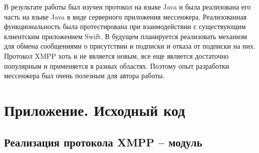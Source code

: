 В результате работы был изучен протокол  на языке Java и была реализована его часть на языке Java в виде серверного приложения мессенжера. Реализованная функциональность была протестирована при взаимодействии с существующим клиентским приложением Swift. В будущем планируется реализовать механизм  для обмена сообщениями о присутствии и подписки и отказа от подписки на них.
Протокол XMPP хоть и не является новым, все еще является достаточно популярным и применяется в разных областях. Поэтому опыт разработки мессенжера был очень полезным для автора работы.

\section{Приложение. Исходный код}

\subsection{Реализация протокола XMPP -- модуль }

















